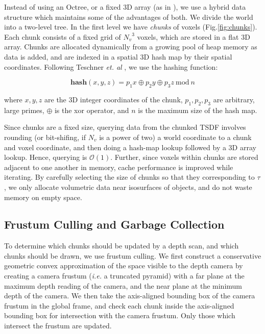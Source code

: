 \documentclass[10pt,twocolumn,letterpaper]{article}
\newcommand{\figref}[1]{Fig.\ref{#1}}
\begin{document}
Instead of using an Octree, or a fixed 3D array (as in \cite{Newcombe,
Whelan2013}), we use a hybrid data structure which maintains some of the
advantages of both. We divide the world into a two-level tree. In the first
level we have \emph{chunks} of voxels (\figref{fig:chunks}). Each chunk consists of a
fixed grid of ${N_v}^3$ voxels, which are stored in a flat 3D array. Chunks are
allocated dynamically from a growing pool of heap memory as data is added, and
are indexed in a spatial 3D hash map \cite{SpatialHashing} by their spatial
coordinates. Following Teschner \emph{et. al} \cite{SpatialHashing}, we use the
hashing function:

\begin{equation}
\textbf{hash}(x, y, z) = p_1 x\oplus p_2 y \oplus p_3 z
~\text{mod}~n
\end{equation}

\noindent where $x, y, z$ are the 3D integer coordinates of the chunk, $p_1,
p_2, p_3$ are arbitrary, large primes, $\oplus$ is the xor operator, and $n$ is
the maximum size of the hash map.

Since chunks are a fixed size, querying data from the chunked TSDF involves
rounding (or bit-shifing, if $N_v$ is a power of two) a world coordinate to a
chunk and voxel coordinate, and then doing a hash-map lookup followed by a 3D
array lookup. Hence, querying is $\mathcal{O}(1)$. Further, since voxels within
chunks are stored adjacent to one another in memory, cache performance is
improved while iterating. By carefully selecting the size of chunks so that they
corresponding to $\tau$, we only allocate volumetric data near isosurfaces of
objects, and do not waste memory on empty space.

\subsection{Frustum Culling and Garbage Collection}
\label{section:frustum}
To determine which chunks should be updated by a depth scan, and which chunks
should be drawn, we use frustum culling. We first construct a conservative
geometric convex approximation of the space visible to the depth camera by
creating a camera frustum (\textit{i.e.} a truncated pyramid) with a far plane
at the maximum depth reading of the camera, and the near plane at the minimum
depth of the camera. We then take the axis-aligned bounding box of the camera
frustum in the global frame, and check each chunk inside the axis-aligned
bounding box for intersection with the camera frustum. Only those which
intersect the frustum are updated. 
\end{document}
